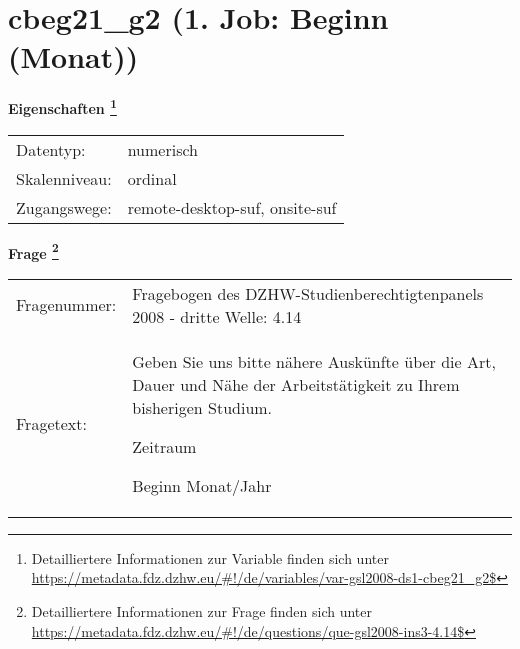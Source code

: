 
    \setcounter{footnote}{0}

    \vspace*{-1.8cm}
	\section{cbeg21\_g2 (1. Job: Beginn (Monat))}
	\label{section:cbeg21_g2}



    \vspace*{0.5cm}
    \noindent\textbf{Eigenschaften
	\footnote{Detailliertere Informationen zur Variable finden sich unter
		\url{https://metadata.fdz.dzhw.eu/\#!/de/variables/var-gsl2008-ds1-cbeg21_g2$}}}\\
	\begin{tabularx}{\hsize}{@{}lX}
	Datentyp: & numerisch \\
	Skalenniveau: & ordinal \\
	Zugangswege: &
	  remote-desktop-suf, 
	  onsite-suf
 \\
    \end{tabularx}



				\vspace*{0.5cm}
                \noindent\textbf{Frage
	                \footnote{Detailliertere Informationen zur Frage finden sich unter
		              \url{https://metadata.fdz.dzhw.eu/\#!/de/questions/que-gsl2008-ins3-4.14$}}}\\
				\begin{tabularx}{\hsize}{@{}lX}
					Fragenummer: &
					  Fragebogen des DZHW-Studienberechtigtenpanels 2008 - dritte Welle:
					  4.14
 \\
					Fragetext: & Geben Sie uns bitte nähere Auskünfte über die Art, Dauer und Nähe der Arbeitstätigkeit zu Ihrem bisherigen Studium.\par  Zeitraum\par  Beginn Monat/Jahr \\
				\end{tabularx}





